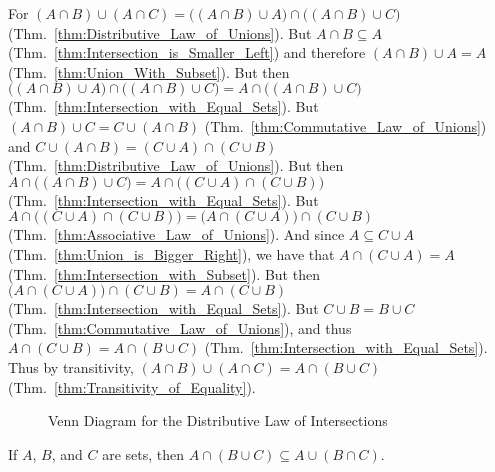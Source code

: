         \begin{bproof}
            For $(A\cap{B})\cup(A\cap{C})=\big((A\cap{B})\cup{A}\big)%
                 \cap\big((A\cap{B})\cup{C}\big)$
            (Thm.~\ref{thm:Distributive_Law_of_Unions}). But
            $A\cap{B}\subseteq{A}$ (Thm.~\ref{thm:Intersection_is_Smaller_Left})
            and therefore $(A\cap{B})\cup{A}=A$
            (Thm.~\ref{thm:Union_With_Subset}). But then
            $\big((A\cap{B})\cup{A}\big)\cap\big((A\cap{B})\cup{C}\big)%
             =A\cap\big((A\cap{B})\cup{C}\big)$
            (Thm.~\ref{thm:Intersection_with_Equal_Sets}). But
            $(A\cap{B})\cup{C}=C\cup(A\cap{B})$
            (Thm.~\ref{thm:Commutative_Law_of_Unions}) and
            $C\cup(A\cap{B})=(C\cup{A})\cap(C\cup{B})$
            (Thm.~\ref{thm:Distributive_Law_of_Unions}). But then
            $A\cap\big((A\cap{B})\cup{C}\big)%
             =A\cap\big((C\cup{A})\cap(C\cup{B})\big)$
            (Thm.~\ref{thm:Intersection_with_Equal_Sets}). But
            $A\cap\big((C\cup{A})\cap(C\cup{B})\big)%
             =\big(A\cap(C\cup{A})\big)\cap(C\cup{B})$
            (Thm.~\ref{thm:Associative_Law_of_Unions}). And since
            $A\subseteq{C}\cup{A}$ (Thm.~\ref{thm:Union_is_Bigger_Right}), we
            have that $A\cap(C\cup{A})=A$
            (Thm.~\ref{thm:Intersection_with_Subset}). But then
            $\big(A\cap(C\cup{A})\big)\cap(C\cup{B})=A\cap(C\cup{B})$
            (Thm.~\ref{thm:Intersection_with_Equal_Sets}). But
            $C\cup{B}=B\cup{C}$ (Thm.~\ref{thm:Commutative_Law_of_Unions}),
            and thus $A\cap(C\cup{B})=A\cap(B\cup{C})$
            (Thm.~\ref{thm:Intersection_with_Equal_Sets}).
            Thus by transitivity, $(A\cap{B})\cup(A\cap{C})=A\cap(B\cup{C})$
            (Thm.~\ref{thm:Transitivity_of_Equality}).
        \end{bproof}
        \begin{figure}[H]
            \centering
            \captionsetup{type=figure}
            
            \caption{Venn Diagram for the Distributive Law of Intersections}
            \label{fig:Venn_Diagram_Distributive_Law_of_Intersections}
        \end{figure}
        \begin{theorem}
            \label{thm:Dist_Law_Inter_Subset_of_Dist_Law_Union}%
            If $A$, $B$, and $C$ are sets, then
            $A\cap(B\cup{C})\subseteq{A}\cup(B\cap{C})$.
        \end{theorem}
